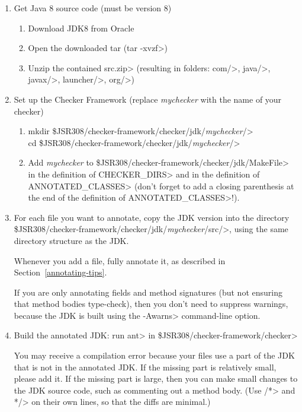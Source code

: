 \begin{enumerate}
\item
Get Java 8 source code (must be version 8)
\begin{enumerate}
\item Download JDK8 from Oracle
\item Open the downloaded tar (\<tar -xvzf>)
\item Unzip the contained \<src.zip> (resulting in folders: \<com/>, \<java/>, \<javax/>, \<launcher/>, \<org/>)
\end{enumerate}

\item
Set up the Checker Framework (replace \textit{mychecker} with the name of your checker)
\begin{enumerate}
\item \<mkdir \$JSR308/checker-framework/checker/jdk/\textit{mychecker}/> \\
  \<cd \$JSR308/checker-framework/checker/jdk/\textit{mychecker}/> \\

\item Add \textit{mychecker} to
  \<\$JSR308/checker-framework/checker/jdk/MakeFile> in the  definition of
  \<CHECKER\_DIRS> and in the definition of \<ANNOTATED\_CLASSES> (don't forget
  to add a closing parenthesis at the end of the definition of \<ANNOTATED\_CLASSES>!).

\end{enumerate}

\item
For each file you want to annotate, copy the JDK version into the
directory
\<\$JSR308/checker-framework/checker/jdk/\textit{mychecker}/src/>, using
the same directory structure as the JDK\@.

Whenever you add a file, fully annotate it, as described in
Section~\ref{annotating-tips}.

If you are only annotating fields and method signatures (but not
ensuring that method bodies type-check), then you don't need to suppress
warnings, because the JDK is built using the \<-Awarns> command-line
option.

\item
Build the annotated JDK:
	run \<ant> in \<\$JSR308/checker-framework/checker>

You may receive a compilation error because your files use a part of the
JDK that is not in the annotated JDK\@.  If the missing part is relatively
small, please add it.  If the missing part is large, then you can make
small changes to the JDK source code, such as commenting out a method body.
(Use \</*> and \<*/> on their own lines, so that the diffs are minimal.)

\end{enumerate}


